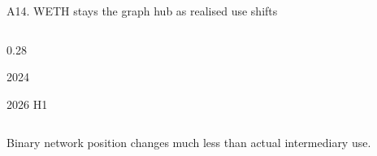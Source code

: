 \begin{frame}{A14. WETH stays the graph hub as realised use shifts}
\begin{columns}[T,totalwidth=0.92\textwidth]
\begin{column}{0.28\textwidth}
{\small 2024\par}
\vspace{0.16cm}
{\fontsize{22}{24}\selectfont\bfseries\color{stable}\NetworkStableDuoPositionTwentySix}\par
{\small 2026 H1\par}
\end{column}
\end{columns}
\vspace{0.48cm}
{\large Binary network position changes much less than actual intermediary use.\par}
\end{frame}

